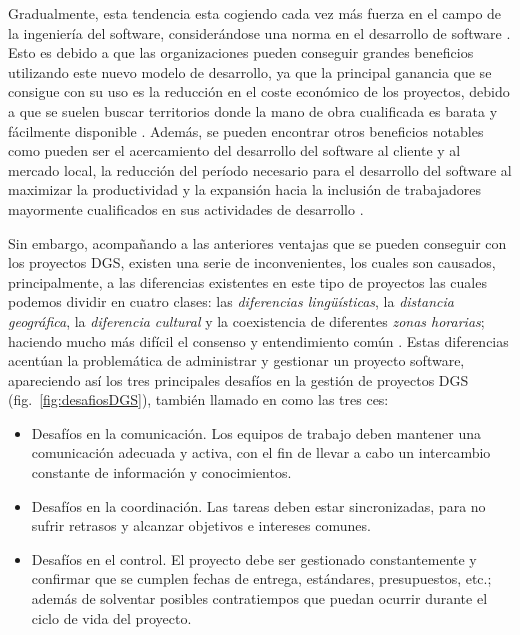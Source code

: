 Gradualmente, esta tendencia esta cogiendo cada vez más fuerza en el campo de la ingeniería del software, considerándose una norma en el desarrollo de software \cite{bosnic2019assessing}. Esto es debido a que las organizaciones pueden conseguir grandes beneficios utilizando este nuevo modelo de desarrollo, ya que la principal ganancia que se consigue con su uso es la reducción en el coste económico de los proyectos, debido a que se suelen buscar territorios donde la mano de obra cualificada es barata y fácilmente disponible \cite{monasor2010preparing}. Además, se pueden encontrar otros beneficios notables como pueden ser el acercamiento del desarrollo del software al cliente y al mercado local, la reducción del período necesario para el desarrollo del software al maximizar la productividad y la expansión hacia la inclusión de trabajadores mayormente cualificados en sus actividades de desarrollo \cite{aagerfalk2008benefits}.

Sin embargo, acompañando a las anteriores ventajas que se pueden conseguir con los proyectos DGS, existen una serie de inconvenientes, los cuales son causados, principalmente, a las diferencias existentes en este tipo de proyectos las cuales podemos dividir en cuatro clases: las \emph{diferencias lingüísticas}, la \emph{distancia geográfica}, la \emph{diferencia cultural} y la coexistencia de diferentes \emph{zonas horarias}; haciendo mucho más difícil el consenso y entendimiento común \cite{monasor2010preparing}. Estas diferencias acentúan la problemática de administrar y gestionar un proyecto software, apareciendo así los tres principales desafíos en la gestión de proyectos DGS (fig.~\ref{fig:desafiosDGS}), también llamado en \cite{piattini2014desarrollo} como las tres ces:
\begin{itemize}
	\item Desafíos en la comunicación. Los equipos de trabajo deben mantener una comunicación adecuada y activa, con el fin de llevar a cabo un intercambio constante de información y conocimientos. 
	\item Desafíos en la coordinación. Las tareas deben estar sincronizadas, para no sufrir retrasos y alcanzar objetivos e intereses comunes. 
	\item Desafíos en el control. El proyecto debe ser gestionado constantemente y confirmar que se cumplen fechas de entrega, estándares, presupuestos, etc.; además de solventar posibles contratiempos que puedan ocurrir durante el ciclo de vida del proyecto. 
\end{itemize}

